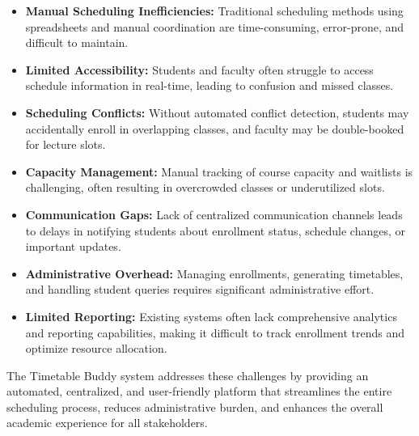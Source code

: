 \begin{itemize}[leftmargin=*]
    \item \textbf{Manual Scheduling Inefficiencies:} Traditional scheduling methods using spreadsheets and manual coordination are time-consuming, error-prone, and difficult to maintain.
    
    \item \textbf{Limited Accessibility:} Students and faculty often struggle to access schedule information in real-time, leading to confusion and missed classes.
    
    \item \textbf{Scheduling Conflicts:} Without automated conflict detection, students may accidentally enroll in overlapping classes, and faculty may be double-booked for lecture slots.
    
    \item \textbf{Capacity Management:} Manual tracking of course capacity and waitlists is challenging, often resulting in overcrowded classes or underutilized slots.
    
    \item \textbf{Communication Gaps:} Lack of centralized communication channels leads to delays in notifying students about enrollment status, schedule changes, or important updates.
    
    \item \textbf{Administrative Overhead:} Managing enrollments, generating timetables, and handling student queries requires significant administrative effort.
    
    \item \textbf{Limited Reporting:} Existing systems often lack comprehensive analytics and reporting capabilities, making it difficult to track enrollment trends and optimize resource allocation.
\end{itemize}

The Timetable Buddy system addresses these challenges by providing an automated, centralized, and user-friendly platform that streamlines the entire scheduling process, reduces administrative burden, and enhances the overall academic experience for all stakeholders.
